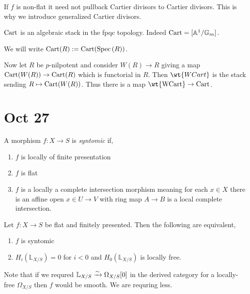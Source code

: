 \documentclass[12pt]{article}
\begin{document}
\begin{rmk}
If $f$ is non-flat it need not pullback Cartier divisors to Cartier divisors. This is why we introduce generalized Cartier divisors.
\end{rmk}

\begin{prop}
$\mathrm{Cart}$ is an algebraic stack in the fpqc topology. Indeed $\mathrm{Cart} = [\mathbb{A}^1 / \mathbb{G}_m]$. 
\end{prop}

\begin{rmk}
We will write $\mathrm{Cart}(R) := \mathrm{Cart}(\mathrm{Spec}\left( R \right))$.
\end{rmk}

\newcommand{\WCart}{\mathrm{WCart}}

Now let $R$ be $p$-nilpotent and consider $W(R) \to R$ giving a map $\mathrm{Cart}(W(R)) \to \mathrm{Cart}(R)$ which is functorial in $R$. Then $\wt{WCart}$ is the stack sending $R \mapsto \mathrm{Cart}(W(R))$. Thus there is a map $\wt{\WCart} \to \Cart$. 

\section{Oct 27}

\begin{defn}
A morphism $f : X \to S$ is \textit{syntomic} if,
\begin{enumerate}
\item $f$ is locally of finite presentation
\item $f$ is flat
\item $f$ is a locally a complete intersection morphism meaning for each $x \in X$ there is an affine open $x \in U \to V$ with ring map $A \to B$ is a local complete intersection.
\end{enumerate}
\end{defn}

\begin{prop}
Let $f : X \to S$ be flat and finitely presented. Then the following are equivalent,
\begin{enumerate}
\item $f$ is syntomic
\item $H_i(\mathbb{L}_{X/S}) = 0$ for $i < 0$ and $H_0(\mathbb{L}_{X/S})$ is locally free.
\end{enumerate}
\end{prop}

\begin{rmk}
Note that if we requred $\mathbb{L}_{X/S} \xrightarrow{\sim} \Omega_{X/S}[0]$ in the derived category for a locally-free $\Omega_{X/S}$ then $f$ would be smooth. We are requring less. 
\end{rmk}
\end{document}
